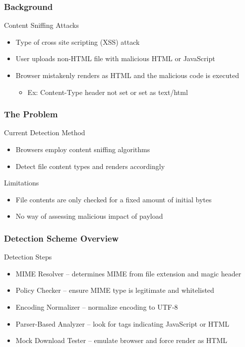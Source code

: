 \documentclass[10pt,mathserif]{beamer}
\begin{document}
\begin{frame}
  \frametitle{Background}
  \begin{block}{Content Sniffing Attacks}
    \begin{itemize}
    \item Type of cross site scripting (XSS) attack
    \item User uploads non-HTML file with malicious HTML or JavaScript
    \item Browser mistakenly renders as HTML and the malicious code is executed
      \begin{itemize}
      \item Ex: Content-Type header not set or set as text/html
      \end{itemize}
    \end{itemize}
  \end{block}
\end{frame}
\begin{frame}
  \frametitle{The Problem}
  \begin{block}{Current Detection Method}
    \begin{itemize}
    \item Browsers employ content sniffing algorithms
    \item Detect file content types and renders accordingly
    \end{itemize}
  \end{block}
  \begin{block}{Limitations}
    \begin{itemize}
    \item File contents are only checked for a fixed amount of initial bytes
    \item No way of assessing malicious impact of payload
    \end{itemize}
  \end{block}
\end{frame}
\begin{frame}
  \frametitle{Detection Scheme Overview}
  \begin{block}{Detection Steps}
    \begin{itemize}
    \item MIME Resolver -- determines MIME from file extension and magic header
    \item Policy Checker -- ensure MIME type is legitimate and whitelisted
    \item Encoding Normalizer -- normalize encoding to UTF-8
    \item Parser-Based Analyzer -- look for tags indicating JavaScript or HTML
    \item Mock Download Tester -- emulate browser and force render as HTML
    \end{itemize}
  \end{block}
\end{frame}
\end{document}
